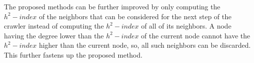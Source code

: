 \documentclass[12pt,3p]{article}
\begin{document}
%																			
%																			
%																			
%																			
%																			
%																			
%																			
%																			
%																			
%																			
%
%																	


The proposed methods can be further improved by only computing the $h^2-index$ of the neighbors that can be considered for the next step of the crawler instead of computing the $h^2-index$ of all of its neighbors. A node having the degree lower than the $h^2-index$ of the current node cannot have the $h^2-index$ higher than the current node, so, all such neighbors can be discarded. This further fastens up the proposed method. 

\end{document}
